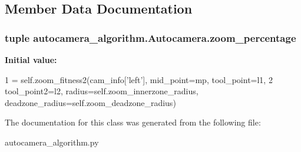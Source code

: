 \subsection{Member Data Documentation}
\hypertarget{classautocamera__algorithm_1_1Autocamera_a43fdedb88b14ed5863465f63c1d34a68}{
\subsubsection[{zoom\-\_\-percentage}]{\setlength{\rightskip}{0pt plus 5cm}tuple autocamera\-\_\-algorithm.\-Autocamera.\-zoom\-\_\-percentage\hspace{0.3cm}{\ttfamily [static]}}}\label{classautocamera__algorithm_1_1Autocamera_a43fdedb88b14ed5863465f63c1d34a68}
{\bfseries Initial value\-:}
\begin{DoxyCode}
1 = self.zoom\_fitness2(cam\_info[\textcolor{stringliteral}{'left'}], mid\_point=mp, tool\_point=l1, 
2                                             tool\_point2=l2, radius=self.zoom\_innerzone\_radius, 
      deadzone\_radius=self.zoom\_deadzone\_radius)
\end{DoxyCode}


The documentation for this class was generated from the following file\-:\begin{DoxyCompactItemize}
\item 
autocamera\-\_\-algorithm.\-py\end{DoxyCompactItemize}
